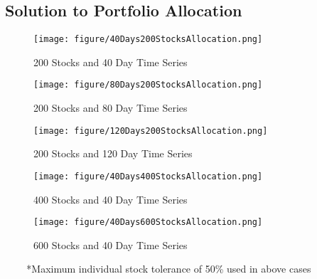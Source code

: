 \subsection{Solution to Portfolio Allocation}
\begin{figure}[H]
\centering
\texttt{[image: figure/40Days200StocksAllocation.png]}\\[-0.5cm]
\caption{200 Stocks and 40 Day Time Series\label{fig:200_40}}
\end{figure}

\begin{figure}[H]
\centering
\texttt{[image: figure/80Days200StocksAllocation.png]}\\[-0.5cm]
\caption{200 Stocks and 80 Day Time Series\label{fig:200_80}}
\end{figure}

\begin{figure}[H]
\centering
\texttt{[image: figure/120Days200StocksAllocation.png]}\\[-0.5cm]
\caption{200 Stocks and 120 Day Time Series\label{fig:200_120}}
\end{figure}

\begin{figure}[H]
\centering
\texttt{[image: figure/40Days400StocksAllocation.png]}\\[-0.5cm]
\caption{400 Stocks and 40 Day Time Series\label{fig:400_40}}
\end{figure}

\begin{figure}[H]
\centering
\texttt{[image: figure/40Days600StocksAllocation.png]}\\[-0.5cm]
\caption{600 Stocks and 40 Day Time Series\label{fig:600_40}}
\end{figure}


%
\indent \indent ~ ~ ~*Maximum individual stock tolerance of 50\% used in above cases \\[0.1cm]

